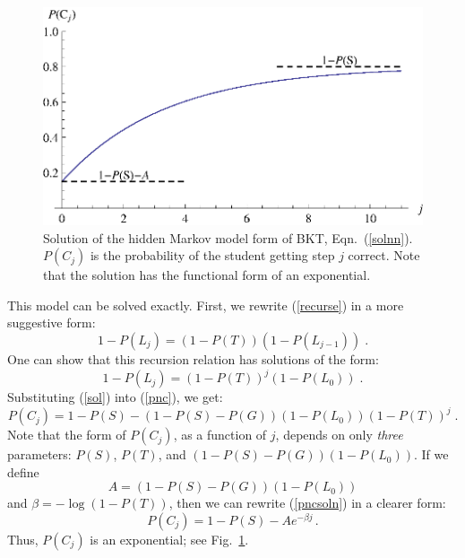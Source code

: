 \documentclass[jedm,acmnow]{acmtrans2m}
\begin{document}
\begin{figure}
\centering\includegraphics{exponential.eps}
\caption{Solution of the hidden Markov model form of BKT, Eqn.~(\ref{solnn}).
          $P(C_j)$ is the probability of  the student getting step $j$
          correct.  Note that the solution has the functional form of
          an exponential.}
\label{bktgraph}
\end{figure}

This model can be  solved exactly.  First, we rewrite (\ref{recurse}) 
in a more suggestive form:
%
\begin{equation}
        1-P(L_j) = \left(1-P(T)\right) \left(1-P(L_{j-1})\right) \; .
\end{equation}
%
One can show that this recursion relation has solutions of the form:
%
\begin{equation}
            1-P(L_j) = \left(1-P(T)\right)^j\left(1-P(L_0)\right) \; .
	    \label{sol}
\end{equation}
%
%
Substituting (\ref{sol}) into (\ref{pnc}), we get:
%
\begin{equation}
        P(C_j) = 1-P(S) -\left(1-P(S)-P(G)\right) \left(1-P(L_0)\right)
                   \left(1-P(T)\right)^j \; . \label{pncsoln}
\end{equation}
%
Note that the form of $P(C_j)$, as a function of $j$, 
depends on only {\em three} parameters:  $P(S)$, $P(T)$, and 
$\left(1-P(S)-P(G)\right) \left(1-P(L_0)\right)$.
If we define
%
\begin{equation} 
          A=\left(1-P(S)-P(G)\right) \left(1-P(L_0)\right)  \label{aa}
\end{equation}
%
 and $\beta=-\log(1-P(T))$, then we can rewrite (\ref{pncsoln}) in 
a clearer form:
%
\begin{equation}
         P(C_j) = 1-P(S) -A e^{-\beta j} \, . \label{solnn}
\end{equation}
%
Thus, $P(C_j)$ is an exponential; see Fig.~\ref{bktgraph}.
\end{document}
